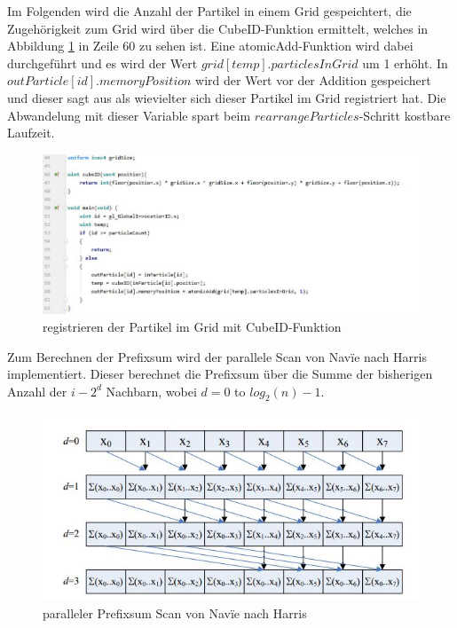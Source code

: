 \documentclass[intern,palatino]{cgBA}
\begin{document}
Im Folgenden wird die Anzahl der Partikel in einem Grid gespeichtert, die Zugehörigkeit zum Grid wird über die CubeID-Funktion ermittelt, welches in Abbildung \ref{img:lable} in Zeile 60 zu sehen ist. Eine atomicAdd-Funktion wird dabei durchgeführt und es wird der Wert $grid[temp].particlesInGrid$ um 1 erhöht. In $outParticle[id].memoryPosition$ wird der Wert vor der Addition gespeichert und dieser sagt aus als wievielter sich dieser Partikel im Grid registriert hat. Die Abwandelung mit dieser Variable spart beim $rearrange Particles$-Schritt kostbare Laufzeit.

\begin{figure}[H]
	\centering
	\includegraphics[width=1.3\columnwidth]{Bilder/lable.jpg}
	\caption{registrieren der Partikel im Grid mit CubeID-Funktion }
	\label{img:lable}
\end{figure}

Zum Berechnen der Prefixsum wird der parallele Scan von Nav\"{i}e nach Harris \cite{harris2007parallel} implementiert. Dieser berechnet die Prefixsum über die Summe der bisherigen Anzahl der $i - 2^d$ Nachbarn, wobei $d = 0$ to $log_2(n)-1$.

\begin{figure}[H]
	\centering
	\includegraphics[width=1.0\columnwidth]{Bilder/PrefixSum.jpg}
	\caption{paralleler Prefixsum Scan von Nav\"{i}e nach Harris \cite{harris2007parallel}}
	\label{img:prefixsum}
\end{figure}
\end{document}
